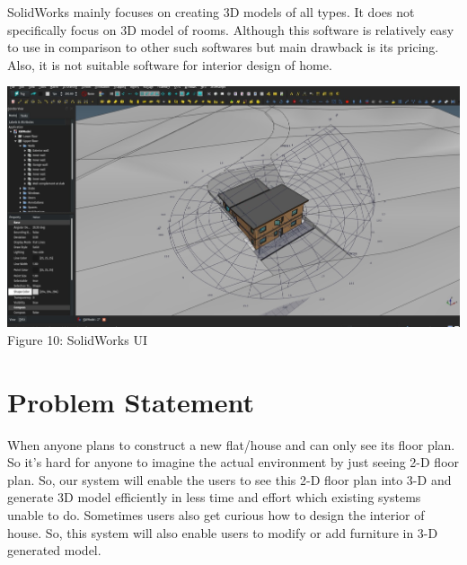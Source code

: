 \documentclass{article}
\begin{document}
SolidWorks mainly focuses on creating 3D models of all types. It does not specifically focus on 3D model of rooms. Although this software is relatively easy to use in comparison to other such softwares but main drawback is its pricing.  Also, it is not suitable software for interior design of home.\cite{freecad}\\
\begin{center}
\includegraphics[scale=0.3]{SolidWorks}
\\Figure 10: SolidWorks UI
\end{center}

\section{Problem Statement}
When anyone plans to construct a new flat/house and can only see its floor plan. So it’s hard for anyone to imagine the actual environment by just seeing 2-D floor plan. So, our system will enable the users to see this 2-D floor plan into 3-D and generate 3D model efficiently in less time and effort which existing systems unable to do. Sometimes users also get curious how to design the interior of house. So, this system will also enable users to modify or add furniture in 3-D generated model.
\end{document}
